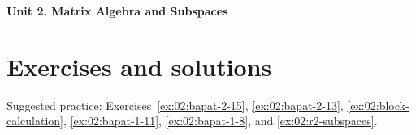 \documentclass[12pt]{article}
\begin{document}
{\Large\bfseries Unit 2. Matrix Algebra and Subspaces}\par

\clearpage
\section*{Exercises and solutions}
Suggested practice: Exercises~\ref{ex:02:bapat-2-15},
\ref{ex:02:bapat-2-13}, \ref{ex:02:block-calculation},
\ref{ex:02:bapat-1-11}, \ref{ex:02:bapat-1-8}, and
\ref{ex:02:r2-subspaces}.

\end{document}
